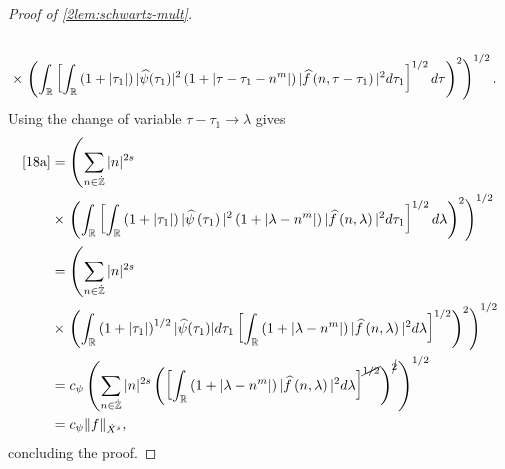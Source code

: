 \begin{proof}[Proof of \cref{2lem:schwartz-mult}]
\begin{equation}
\begin{split}
		\\
		& \times \left. \left( \int_{\mathbb{R}} \left[ \int_{\mathbb{R}}
		\left( 1 + | \tau_{1} | \right) | \widehat{\psi}(\tau_1) |^2 \left( 1 + |
		\tau - \tau_1 - n^{m} |
		\right) | \widehat{f}\left( n, \tau - \tau_1 \right) |^2 d \tau_1 
		\right]^{1/2} d \tau \right)^2 \right)^{1/2}.
	\end{split}
\end{equation}
%
%
Using the change of variable $\tau - \tau_1 \to \lambda$ gives
%
%
\begin{equation*}
	\begin{split}
		\eqref{18a}
		& = \left( \sum_{n \in \dot{\mathbb{Z}}} |n|^{2s}\right.
		\\
		& \times \left.  \left( \int_{\mathbb{R}} \left[
		\int_{\mathbb{R}} \left( 1 + | \tau_1 | \right) | \widehat{\psi}\left( \tau_1
		\right) |^2 \left( 1 + | \lambda - n^{m} | \right) | \widehat{f} \left( n,
		\lambda
		\right)|^2 d \tau_1 \right]^{1/2} d \lambda \right)^2 \right)^{1/2}
		\\
		& =  \left( \sum_{n \in \dot{\mathbb{Z}}} |n|^{2s} \right.
		\\
		& \times \left. \left( \int_{\mathbb{R}} \left( 1 + |
		\tau_1 |
		\right)^{1/2} | \widehat{\psi}(\tau_1) | d \tau_1 \left[ \int_{\mathbb{R}} \left( 1 + |
		\lambda - n^{m} |
		\right) | \widehat{f}\left( n, \lambda \right) |^2 d \lambda \right]^{1/2}
		\right)^2 \right)^{1/2}
		\\
		& = c_{\psi} \left( \sum_{n \in \dot{\mathbb{Z}}} |n|^{2s} \left( \left[ \int_{\mathbb{R}}
		\left( 1 + | \lambda - n^{m} | \right) | \widehat{f}\left( n, \lambda
		\right) |^2 d \lambda
		\right]^{\cancel{1/2}} \right)^{\cancel{2}} \right)^{1/2}
		\\
		& = c_{\psi} \|f\|_{\dot{X}^s},
	\end{split}
\end{equation*}
%
%
concluding the proof. 
\end{proof}

